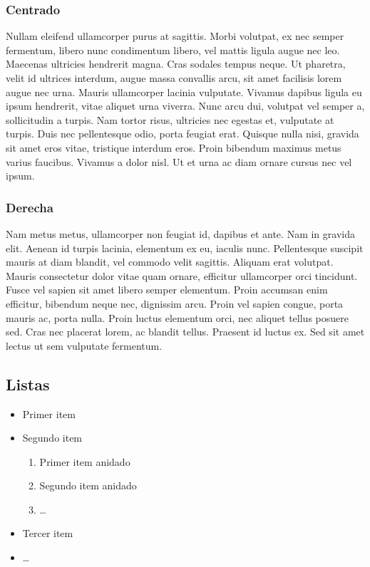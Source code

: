 \documentclass[12pt,a4paper]{article}
\begin{document}
\subsubsection{Centrado}

\begin{center}
  Nullam eleifend ullamcorper purus at sagittis. Morbi volutpat,
  ex nec semper fermentum, libero nunc condimentum libero,
  vel mattis ligula augue nec leo. Maecenas ultricies hendrerit magna.
  Cras sodales tempus neque. Ut pharetra, velit id ultrices interdum,
  augue massa convallis arcu, sit amet facilisis lorem augue nec urna.
  Mauris ullamcorper lacinia vulputate.
  Vivamus dapibus ligula eu ipsum hendrerit, vitae aliquet urna viverra.
  Nunc arcu dui, volutpat vel semper a, sollicitudin a turpis.
  Nam tortor risus, ultricies nec egestas et, vulputate at turpis.
  Duis nec pellentesque odio, porta feugiat erat. Quisque nulla nisi,
  gravida sit amet eros vitae, tristique interdum eros.
  Proin bibendum maximus metus varius faucibus. Vivamus a dolor nisl.
  Ut et urna ac diam ornare cursus nec vel ipsum. 
\end{center}

\subsubsection{Derecha}

\begin{flushright}
  Nam metus metus, ullamcorper non feugiat id, dapibus et ante.
  Nam in gravida elit. Aenean id turpis lacinia, elementum ex eu, iaculis nunc.
  Pellentesque suscipit mauris at diam blandit, vel commodo velit sagittis.
  Aliquam erat volutpat. Mauris consectetur dolor vitae quam ornare,
  efficitur ullamcorper orci tincidunt.
  Fusce vel sapien sit amet libero semper elementum.
  Proin accumsan enim efficitur, bibendum neque nec, dignissim arcu.
  Proin vel sapien congue, porta mauris ac, porta nulla.
  Proin luctus elementum orci, nec aliquet tellus posuere sed.
  Cras nec placerat lorem, ac blandit tellus. Praesent id luctus ex.
  Sed sit amet lectus ut sem vulputate fermentum. 
\end{flushright}

\subsection{Listas}

\begin{itemize}
  \item Primer item
  \item Segundo item
  \begin{enumerate}
    \item Primer item anidado
    \item Segundo item anidado
    \item \dots
  \end{enumerate}
  \item Tercer item
  \item \dots
\end{itemize}
\end{document}

